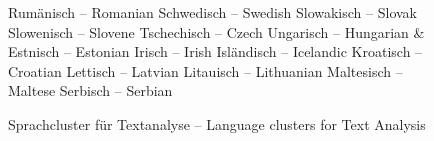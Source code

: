 \documentclass[]{../../metanetpaper}
\begin{document}
\begin{Parallel}[c]{79mm}{78mm}
\begin{figure}
\begin{tabular}
Rumänisch -- Romanian \newline 
Schwedisch -- Swedish \newline 
Slowakisch -- Slovak \newline 
Slowenisch -- Slovene \newline 
Tschechisch -- Czech \newline 
Ungarisch -- Hungarian 
& 
Estnisch -- Estonian \newline 
Irisch -- Irish \newline 
Isländisch -- Icelandic \newline 
Kroatisch -- Croatian \newline 
Lettisch -- Latvian \newline 
Litauisch -- Lithuanian \newline 
Maltesisch -- Maltese \newline 
Serbisch -- Serbian \\
\end{tabular}
\label{fig:text_cluster}
\caption{Sprachcluster für Textanalyse -- Language clusters for Text Analysis}
\end{figure}


\end{Parallel}
\end{document}
